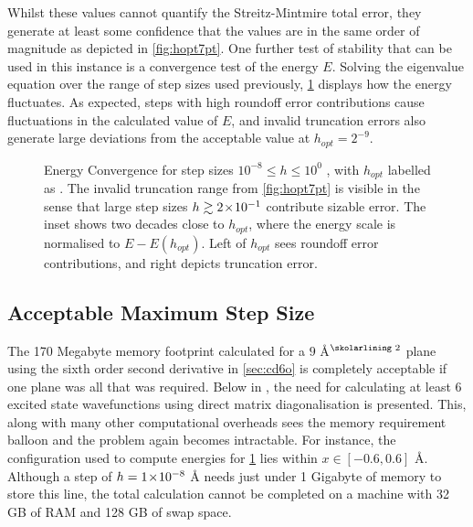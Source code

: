 Whilst these values cannot quantify the Streitz-Mintmire total error, they generate at least some confidence that the values are in the same order of magnitude as depicted in \cref{fig:hopt7pt}.
One further test of stability that can be used in this instance is a convergence test of the energy $E$.
Solving the eigenvalue equation over the range of step sizes used previously, \cref{fig:econv} displays how the energy fluctuates.
As expected, steps with high roundoff error contributions cause fluctuations in the calculated value of $E$, and invalid truncation errors also generate large deviations from the acceptable value at $h_{opt} = 2^{-9}$.
\begin{figure}[htp]
\centering
\resizebox{0.9\columnwidth}{!}{}
\caption[Energy Convergence]{\label{fig:econv}Energy Convergence for step sizes $10^{-8}\!\leq\! h\! \leq\! 10^0$ , with $h_{opt}$ labelled as . The invalid truncation range from \cref{fig:hopt7pt} is visible in the sense that large step sizes $h\gtrsim2\!\times\!10^{-1}$ contribute sizable error. The inset shows two decades close to $h_{opt}$, where the energy scale is normalised to $E-E(h_{opt})$. Left of $h_{opt}$ sees roundoff error contributions, and right depicts truncation error.}
\end{figure}

\subsection{Acceptable Maximum Step Size}

The 170 Megabyte memory footprint calculated for a $9$ Å$^\text{\skolarlining 2}$ plane using the sixth order second derivative in \cref{sec:cd6o} is completely acceptable if one plane was all that was required.
Below in , the need for calculating at least 6 excited state wavefunctions using direct matrix diagonalisation is presented.
This, along with many other computational overheads sees the memory requirement balloon and the problem again becomes intractable.
For instance, the  configuration used to compute energies for \cref{fig:econv} lies within $x \in [-0.6, 0.6]$ Å.
Although a step of $h = 1\!\times\!10^{-8}$ Å needs just under 1 Gigabyte of memory to store this line, the total calculation cannot be completed on a machine with 32 GB of RAM and 128 GB of swap space.

